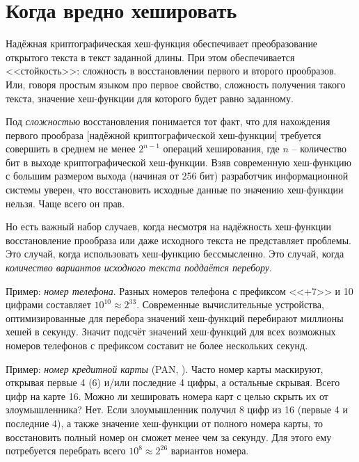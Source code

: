 \section{Когда вредно хешировать}\label{section-when_not_to_hash}

Надёжная криптографическая хеш-функция обеспечивает преобразование открытого текста в текст заданной длины. При этом обеспечивается <<стойкость>>: сложность в восстановлении первого и второго прообразов. Или, говоря простым языком про первое свойство, сложность получения такого текста, значение хеш-функции для которого будет равно заданному.

Под \emph{сложностью} восстановления понимается тот факт, что для нахождения первого прообраза [надёжной криптографической хеш-функции] требуется совершить в среднем не менее $2^{n-1}$ операций хеширования, где $n$ -- количество бит в выходе криптографической хеш-функции. Взяв современную хеш-функцию с большим размером выхода (начиная от 256 бит) разработчик информационной системы уверен, что восстановить исходные данные по значению хеш-функции нельзя. Чаще всего он прав.

Но есть важный набор случаев, когда несмотря на надёжность хеш-функции восстановление прообраза или даже исходного текста не представляет проблемы. Это случай, когда использовать хеш-функцию бессмысленно. Это случай, когда \emph{количество вариантов исходного текста поддаётся перебору}.

Пример: \emph{номер телефона}. Разных номеров телефона с префиксом <<+7>> и 10 цифрами составляет $10^{10} \approx 2^{33}$. Современные вычислительные устройства, оптимизированные для перебора значений хеш-функций перебирают миллионы хешей в секунду. Значит подсчёт значений хеш-функций для всех возможных номеров телефонов с префиксом составит не более нескольких секунд.

Пример: \emph{номер кредитной карты} (PAN, ). Часто номер карты маскируют, открывая первые 4 (6) и/или последние 4 цифры, а остальные скрывая. Всего цифр на карте 16. Можно ли хешировать номера карт с целью скрыть их от злоумышленника? Нет. Если злоумышленник получил 8 цифр из 16 (первые 4 и последние 4), а также значение хеш-функции от полного номера карты, то восстановить полный номер он сможет менее чем за секунду. Для этого ему потребуется перебрать всего $10^{8} \approx 2^{26}$ вариантов номера.

